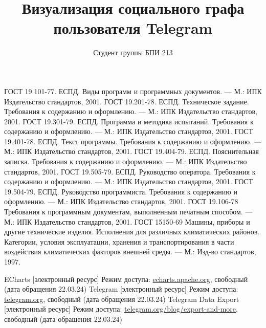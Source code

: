 \documentclass{TechDoc}
\title{Визуализация социального графа пользователя Telegram}
\author{Студент группы БПИ 213}{Н. А. Бирюлин}
\begin{document}
    \maketitle
    
    \tableofcontents

    

    

    

    \begin{thebibliography}{9}
         ГОСТ 19.101-77. ЕСПД. Виды программ и программных документов. --- М.: ИПК Издательство стандартов, 2001.
         ГОСТ 19.201-78. ЕСПД. Техническое задание. Требования к содержанию и оформлению. --- М.: ИПК Издательство стандартов, 2001.
         ГОСТ 19.301-79. ЕСПД. Программа и методика испытаний. Требования к содержанию и оформлению. --- М.: ИПК Издательство стандартов, 2001.
         ГОСТ 19.401-78. ЕСПД. Текст программы. Требования к содержанию и оформлению. --- М.: ИПК Издательство стандартов, 2001.
         ГОСТ 19.404-79. ЕСПД. Пояснительная записка. Требования к содержанию и оформлению. --- М.: ИПК Издательство стандартов, 2001.
         ГОСТ 19.505-79. ЕСПД. Руководство оператора. Требования к содержанию и оформлению. --- М.: ИПК Издательство стандартов, 2001.
         ГОСТ 19.504-79. ЕСПД. Руководство программиста. Требования к содержанию и оформлению. --- М.: ИПК Издательство стандартов, 2001.
         ГОСТ 19.106-78 Требования к программным документам, выполненным печатным способом. --- М.: ИПК Издательство стандартов, 2001.
         ГОСТ 15150-69 Машины, приборы и другие технические изделия. Исполнения для различных климатических районов. Категории, условия эксплуатации, хранения и транспортирования в части воздействия климатических факторов внешней среды. --- М.: Изд-во стандартов, 1997.

         ECharts [электронный ресурс] Режим доступа: \href{https://echarts.apache.org}{echarts.apache.org}, свободный (дата обращения 22.03.24)
         Telegram [электронный ресурс] Режим доступа: \href{https://telegram.org}{telegram.org}, свободный (дата обращения 22.03.24)
         Telegram Data Export [электронный ресурс] Режим доступа: \href{https://telegram.org/blog/export-and-more}{telegram.org/blog/export-and-more}, свободный (дата обращения 22.03.24)
    \end{thebibliography}

    \registrationList
        
\end{document}
